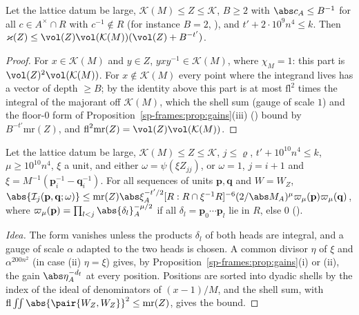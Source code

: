\begin{theorem}
\label{sp-frames:thm:finmass}
Let the lattice datum be large, $\mathcal K(M)\le Z\le\mathcal K$, $B\ge2$ with $\abs c_A\le B^{-1}$
for all $c\in A^\times\cap R$ with $c^{-1}\notin R$ (for instance $B=2$,
), and $t'+2\cdot10^9n^4\le k$. Then
$\varkappa(Z)\le\vol(Z)\vol(\mathcal K(M))(\vol(Z)+B^{-t'})$.
\end{theorem}

\begin{proof}
For $x\in\mathcal K(M)$ and $y\in Z$, $yxy^{-1}\in\mathcal K(M)$, where $\chi_M=1$: this part is
$\vol(Z)^2\vol(\mathcal K(M))$. For $x\notin\mathcal K(M)$ every point where the integrand lives has a
vector of depth $\ge B$; by the identity above this part is at most $\mathrm{fl}^2$ times the integral of the majorant off
$\mathcal K(M)$, which the shell sum (gauge of scale $1$) and the floor-$0$ form of
Proposition~\ref{sp-frames:prop:gains}(iii)
() bound by
$B^{-t'}\mathrm{mr}(Z)$, and $\mathrm{fl}^2\mathrm{mr}(Z)=\vol(Z)\vol(\mathcal K(M))$.
\end{proof}

\begin{theorem}
\label{sp-frames:thm:findecay}
Let the lattice datum be large, $\mathcal K(M)\le Z\le\mathcal K$, $j\le\varrho$, $t'+10^{10}n^4\le k$,
$\mu\ge10^{10}n^4$, $\xi$ a unit, and either $\omega=\psi(\xi Z_{jj})$, or $\omega=1$, $j=i+1$ and
$\xi=M^{-1}(\mathbf p_i^{-1}-\mathbf q_i^{-1})$. For all sequences of units $\mathbf p,\mathbf q$ and $W=W_Z$,
$\abs{\mathcal I_j(\mathbf p,\mathbf q;\omega)}\le\mathrm{mr}(Z)\abs\xi_A^{-t'/2}[R:R\cap\xi^{-1}R]^{-6}(2/\abs M_A)^\mu
\varpi_\mu(\mathbf p)\varpi_\mu(\mathbf q)$, where $\varpi_\mu(\mathbf p)=\prod_{l<j}\abs{\delta_l}_A^{-\mu/2}$ if all
$\delta_l=\mathbf p_0\cdots\mathbf p_l$ lie in $R$, else $0$ ().
\end{theorem}

\begin{proof}[Idea]
The form vanishes unless the products $\delta_l$ of both heads are integral, and a gauge of scale
$\alpha$ adapted to the two heads is chosen. A common divisor $\eta$ of $\xi$ and $\alpha^{200n^2}$
(in case (ii) $\eta=\xi$) gives,
by Proposition~\ref{sp-frames:prop:gains}(i) or (ii), the gain $\abs\eta_A^{-d_{\mathrm f}}$ at every
position.
Positions are sorted into dyadic shells by the index of the ideal of denominators of $(x-1)/M$,
and the shell sum, with $\mathrm{fl}\iint\abs{\pair{W_Z,W_Z}}^2\le\mathrm{mr}(Z)$, gives the bound.
\end{proof}

